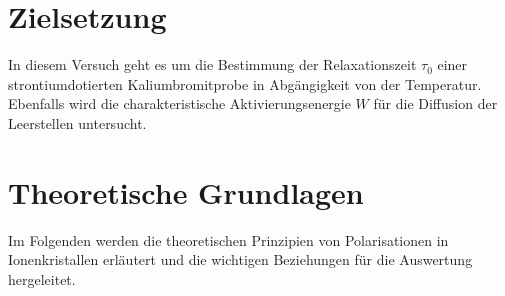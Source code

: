 \section{Zielsetzung}
In diesem Versuch geht es um die Bestimmung der Relaxationszeit $\tau_0$ einer strontiumdotierten Kaliumbromitprobe in Abgängigkeit von der Temperatur. Ebenfalls wird die charakteristische Aktivierungsenergie $W$ für die Diffusion der Leerstellen
untersucht.

\section{Theoretische Grundlagen}

Im Folgenden werden die theoretischen Prinzipien von Polarisationen in Ionenkristallen erläutert und die wichtigen Beziehungen für die Auswertung hergeleitet.

